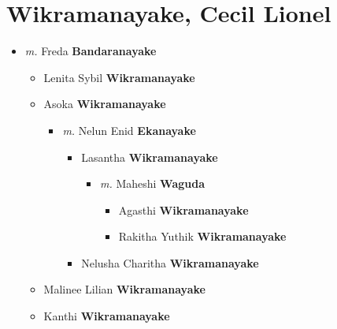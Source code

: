 \documentclass[10pt, openany]{book}
\begin{document}
\chapter{Wikramanayake, Cecil Lionel}
\label{00004182}
\textcolor{slmaroon}{\textit{}}
\begin{itemize}
\item{\textit{m.} Freda \textbf{Bandaranayake} \textcolor{slorange}{\textit{}}   \label{couple:00004182:00004183} \begin{itemize}
\item{Lenita Sybil \textbf{Wikramanayake} \textcolor{slorange}{\textit{}}
  }
\item{Asoka \textbf{Wikramanayake} \textcolor{slorange}{\textit{}}
\begin{itemize}
\item{\textit{m.} Nelun Enid \textbf{Ekanayake} \textcolor{slorange}{\textit{}}   \label{couple:00004185:00004186} \begin{itemize}
\item{Lasantha \textbf{Wikramanayake} \textcolor{slorange}{\textit{}}
\begin{itemize}
\item{\textit{m.} Maheshi \textbf{Waguda} \textcolor{slorange}{\textit{}}   \label{couple:00004187:00004188} \begin{itemize}
\item{Agasthi \textbf{Wikramanayake} \textcolor{slorange}{\textit{}}
 }
\item{Rakitha Yuthik \textbf{Wikramanayake} \textcolor{slorange}{\textit{}}
  }
\end{itemize}}
\end{itemize}
 }
\item{Nelusha Charitha \textbf{Wikramanayake} \textcolor{slorange}{\textit{}}
  }
\end{itemize}}
\end{itemize}
 }
\item{Malinee Lilian \textbf{Wikramanayake} \textcolor{slorange}{\textit{}}
  }
\item{Kanthi \textbf{Wikramanayake} \textcolor{slorange}{\textit{}}
 }
\end{itemize}}
\end{itemize}
  
\end{document}

